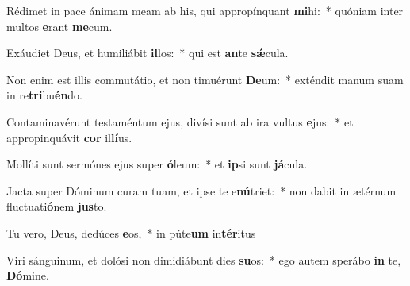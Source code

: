 \item Rédimet in pace ánimam meam ab his, qui appropínquant \textbf{mi}hi:~* quóniam inter multos \textbf{e}rant \textbf{me}cum.
\item Exáudiet Deus, et humiliábit \textbf{il}los:~* qui est \textbf{an}te \textbf{sǽ}cula.
\item Non enim est illis commutátio, et non timuérunt \textbf{De}um:~* exténdit manum suam in re\textbf{tri}bu\textbf{én}do.
\item Contaminavérunt testaméntum ejus, divísi sunt ab ira vultus \textbf{e}jus:~* et appropinquávit \textbf{cor} il\textbf{lí}us.
\item Mollíti sunt sermónes ejus super \textbf{ó}leum:~* et \textbf{ip}si sunt \textbf{já}cula.
\item Jacta super Dóminum curam tuam, et ipse te e\textbf{nú}triet:~* non dabit in ætérnum fluctuati\textbf{ó}nem \textbf{jus}to.
\item Tu vero, Deus, dedúces \textbf{e}os,~* in púte\textbf{um} in\textbf{tér}itus
\item Viri sánguinum, et dolósi non dimidiábunt dies \textbf{su}os:~* ego autem sperábo \textbf{in} te, \textbf{Dó}mine.
